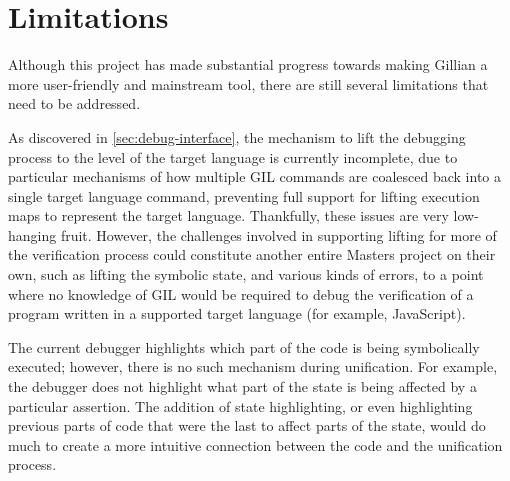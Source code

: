 
\section{Limitations}%
\label{sec:eval:limitations}

Although this project has made substantial progress towards making Gillian a more
user-friendly and mainstream tool, there are still several limitations that need to be
addressed.

As discovered in \autoref{sec:debug-interface}, the mechanism to lift the
debugging process to the level of the target language is currently incomplete,
due to particular mechanisms of how multiple GIL commands are coalesced back
into a single target language command, preventing full support for lifting
execution maps to represent the target language.
Thankfully, these issues are very low-hanging fruit. However, the challenges
involved in supporting lifting for more of the verification process could
constitute another entire Masters project on their own, such as lifting the symbolic
state, and various kinds of errors, to a point where no knowledge of GIL would
be required to debug the verification of a program written in a supported target
language (for example, JavaScript).

The current debugger highlights which part of the code is being symbolically
executed; however, there is no such mechanism during unification.
For example, the debugger does not highlight what part of the state is being
affected by a particular assertion. The addition of state highlighting, or even
highlighting previous parts of code that were the last to affect parts of the
state, would do much to create a more intuitive connection between the code and
the unification process.

